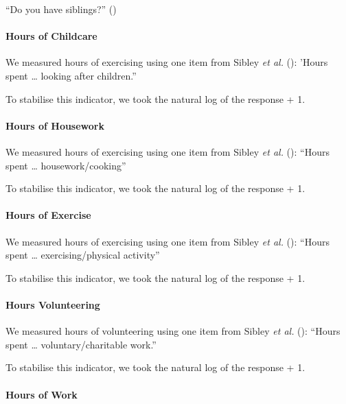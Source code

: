 \documentclass[
  singlecolumn]{article}
\let\oldparagraph\paragraph
\renewcommand{\paragraph}[1]{\oldparagraph{#1}\mbox{}}
\begin{document}
``Do you have siblings?'' ()

\paragraph{Hours of Childcare}\label{hours-of-childcare}

We measured hours of exercising using one item from Sibley \emph{et al.}
(): 'Hours spent \ldots{} looking after
children.''

To stabilise this indicator, we took the natural log of the response +
1.

\paragraph{Hours of Housework}\label{hours-of-housework}

We measured hours of exercising using one item from Sibley \emph{et al.}
(): ``Hours spent \ldots{}
housework/cooking''

To stabilise this indicator, we took the natural log of the response +
1.

\paragraph{Hours of Exercise}\label{hours-of-exercise}

We measured hours of exercising using one item from Sibley \emph{et al.}
(): ``Hours spent \ldots{}
exercising/physical activity''

To stabilise this indicator, we took the natural log of the response +
1.

\paragraph{Hours Volunteering}\label{hours-volunteering}

We measured hours of volunteering using one item from Sibley \emph{et
al.} (): ``Hours spent \ldots{}
voluntary/charitable work.''

To stabilise this indicator, we took the natural log of the response +
1.

\paragraph{Hours of Work}\label{hours-of-work}
\end{document}
